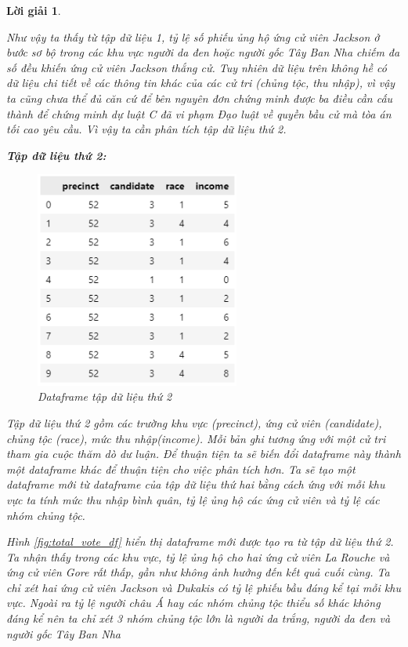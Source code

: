 \documentclass[14pt, a4paper]{article}
\theoremstyle{sltheorem}
\theoremstyle{soltheorem}
\newtheorem*{loigiai}{Lời giải}
\begin{document}
\begin{loigiai}
\begin{enumerate}
    Như vậy ta thấy từ tập dữ liệu 1, tỷ lệ số phiếu ủng hộ ứng cử viên Jackson ở bước sơ bộ trong các khu vực người da đen hoặc người gốc Tây Ban Nha chiếm đa số đều khiến ứng cử viên Jackson thắng cử.
    Tuy nhiên dữ liệu trên không hề có dữ liệu chi tiết về các thông tin khác của các cử tri (chủng tộc, thu nhập), vì vậy ta cũng chưa thể đủ căn cứ để bên nguyên đơn chứng minh được ba điều cần cấu thành để chứng minh dự luật C đã vi phạm Đạo luật về quyền bầu cử mà tòa án tối cao yêu cầu.
    Vì vậy ta cần phân tích tập dữ liệu thứ 2.

    \textbf{Tập dữ liệu thứ 2:}

    \begin{figure}[H]
        \centering
        \includegraphics[width=0.6\textwidth]{figures/vote_df.png}
        \caption{Dataframe tập dữ liệu thứ 2}
        \label{fig:vote_df}
    \end{figure}

    Tập dữ liệu thứ 2 gồm các trường khu vực (precinct), ứng cử viên (candidate), chủng tộc (race), mức thu nhập(income).
    Mỗi bản ghi tương ứng với một cử tri tham gia cuộc thăm dò dư luận.
    Để thuận tiện ta sẽ biến đổi dataframe này thành một dataframe khác để thuận tiện cho việc phân tích hơn.
    Ta sẽ tạo một dataframe mới từ dataframe của tập dữ liệu thứ hai bằng cách ứng với mỗi khu vực ta tính mức thu nhập bình quân, tỷ lệ ủng hộ các ứng cử viên và tỷ lệ các nhóm chủng tộc.

    Hình \ref{fig:total_vote_df} hiển thị dataframe mới được tạo ra từ tập dữ liệu thứ 2.
    Ta nhận thấy trong các khu vực, tỷ lệ ủng hộ cho hai ứng cử viên La Rouche và ứng cử viên Gore rất thấp, gần như không ảnh hưởng đến kết quả cuối cùng.
    Ta chỉ xét hai ứng cử viên Jackson và Dukakis có tỷ lệ phiếu bầu đáng kể tại mỗi khu vực.
    Ngoài ra tỷ lệ người châu Á hay các nhóm chủng tộc thiểu số khác không đáng kể nên ta chỉ xét 3 nhóm chủng tộc lớn là người da trắng, người da đen và người gốc Tây Ban Nha
    

\end{enumerate}
\end{loigiai}
\end{document}

